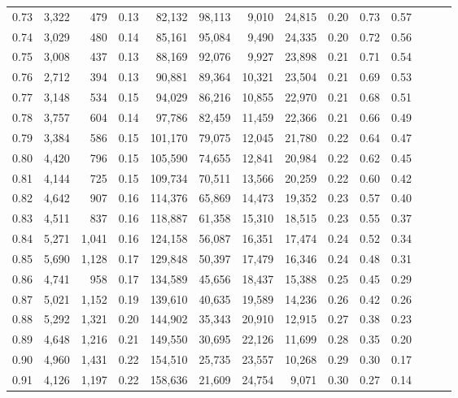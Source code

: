 \begin{tabular}{rrrrrrrrrrrrrr}
0.73 &  3,322 &    479 &  0.13 &   82,132 &   98,113 &   9,010 &  24,815 &  0.20 &  0.73 &      0.57 \\
0.74 &  3,029 &    480 &  0.14 &   85,161 &   95,084 &   9,490 &  24,335 &  0.20 &  0.72 &      0.56 \\
0.75 &  3,008 &    437 &  0.13 &   88,169 &   92,076 &   9,927 &  23,898 &  0.21 &  0.71 &      0.54 \\
0.76 &  2,712 &    394 &  0.13 &   90,881 &   89,364 &  10,321 &  23,504 &  0.21 &  0.69 &      0.53 \\
0.77 &  3,148 &    534 &  0.15 &   94,029 &   86,216 &  10,855 &  22,970 &  0.21 &  0.68 &      0.51 \\
0.78 &  3,757 &    604 &  0.14 &   97,786 &   82,459 &  11,459 &  22,366 &  0.21 &  0.66 &      0.49 \\
0.79 &  3,384 &    586 &  0.15 &  101,170 &   79,075 &  12,045 &  21,780 &  0.22 &  0.64 &      0.47 \\
0.80 &  4,420 &    796 &  0.15 &  105,590 &   74,655 &  12,841 &  20,984 &  0.22 &  0.62 &      0.45 \\
0.81 &  4,144 &    725 &  0.15 &  109,734 &   70,511 &  13,566 &  20,259 &  0.22 &  0.60 &      0.42 \\
0.82 &  4,642 &    907 &  0.16 &  114,376 &   65,869 &  14,473 &  19,352 &  0.23 &  0.57 &      0.40 \\
0.83 &  4,511 &    837 &  0.16 &  118,887 &   61,358 &  15,310 &  18,515 &  0.23 &  0.55 &      0.37 \\
0.84 &  5,271 &  1,041 &  0.16 &  124,158 &   56,087 &  16,351 &  17,474 &  0.24 &  0.52 &      0.34 \\
0.85 &  5,690 &  1,128 &  0.17 &  129,848 &   50,397 &  17,479 &  16,346 &  0.24 &  0.48 &      0.31 \\
0.86 &  4,741 &    958 &  0.17 &  134,589 &   45,656 &  18,437 &  15,388 &  0.25 &  0.45 &      0.29 \\
0.87 &  5,021 &  1,152 &  0.19 &  139,610 &   40,635 &  19,589 &  14,236 &  0.26 &  0.42 &      0.26 \\
0.88 &  5,292 &  1,321 &  0.20 &  144,902 &   35,343 &  20,910 &  12,915 &  0.27 &  0.38 &      0.23 \\
0.89 &  4,648 &  1,216 &  0.21 &  149,550 &   30,695 &  22,126 &  11,699 &  0.28 &  0.35 &      0.20 \\
0.90 &  4,960 &  1,431 &  0.22 &  154,510 &   25,735 &  23,557 &  10,268 &  0.29 &  0.30 &      0.17 \\
0.91 &  4,126 &  1,197 &  0.22 &  158,636 &   21,609 &  24,754 &   9,071 &  0.30 &  0.27 &      0.14 \\

\end{tabular}
